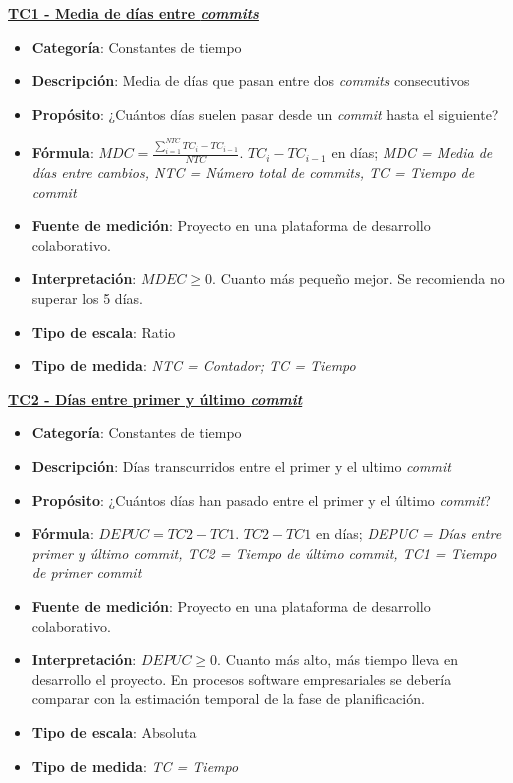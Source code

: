 \textbf{\underline{TC1 - Media de días entre \textit{commits}}}

\begin{itemize}
	\item \textbf{Categoría}: Constantes de tiempo
	\item \textbf{Descripción}: Media de días que pasan entre dos \textit{commits} consecutivos
	\item \textbf{Propósito}: ¿Cuántos días suelen pasar desde un \textit{commit} hasta el siguiente?
	\item \textbf{Fórmula}: $MDC = \frac{\sum_{i=1}^{NTC} TC_i - TC_{i-1}}{NTC}$. $TC_i - TC_{i-1}$ en días; \textit{MDC = Media de días entre cambios, NTC = Número total de \textit{commits}, TC = Tiempo de \textit{commit}}
	\item \textbf{Fuente de medición}: Proyecto en una plataforma de desarrollo colaborativo.
	\item \textbf{Interpretación}: $MDEC \geq 0$. Cuanto más pequeño mejor. Se recomienda no superar los 5 días.
	\item \textbf{Tipo de escala}: Ratio
	\item \textbf{Tipo de medida}: \textit{NTC = Contador; TC = Tiempo}
\end{itemize}

\textbf{\underline{TC2 - Días entre primer y último \textit{commit}}}

\begin{itemize}
	\item \textbf{Categoría}: Constantes de tiempo
	\item \textbf{Descripción}: Días transcurridos entre el primer y el ultimo \textit{commit} 
	\item \textbf{Propósito}: ¿Cuántos días han pasado entre el primer y el último \textit{commit}?
	\item \textbf{Fórmula}: $DEPUC = TC2- TC1$. $TC2- TC1$ en días;  \textit{DEPUC = Días entre primer y último \textit{commit}, TC2 = Tiempo de último \textit{commit}, TC1 = Tiempo de primer \textit{commit}}
	\item \textbf{Fuente de medición}: Proyecto en una plataforma de desarrollo colaborativo.
	\item \textbf{Interpretación}: $DEPUC \geq 0$. Cuanto más alto, más tiempo lleva en desarrollo el proyecto. En procesos software empresariales se debería comparar con la estimación temporal de la fase de planificación. 
	\item \textbf{Tipo de escala}: Absoluta
	\item \textbf{Tipo de medida}: \textit{TC = Tiempo}
\end{itemize}

